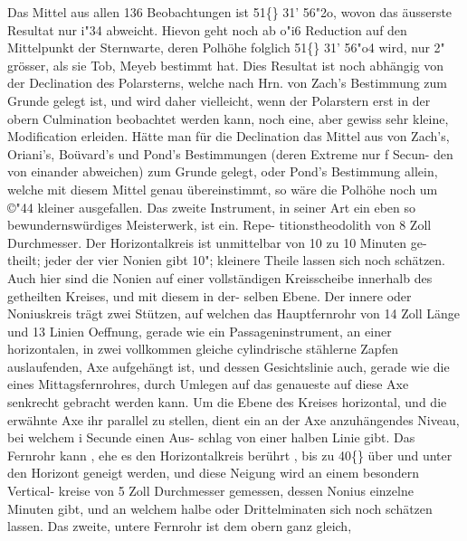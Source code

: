 \documentclass[12pt,a4paper]{article}
\newcommand{\degree}{\textdegree}
\begin{document}
\newpage
Das  Mittel  aus  allen  136  Beobachtungen  ist  51\degree\{\}  31'  56"2o,  wovon  das  äusserste  Resultat  nur  i"34 
abweicht.  Hievon  geht  noch  ab  o"i6  Reduction  auf  den  Mittelpunkt  der  Sternwarte,  deren  Polhöhe 
folglich  51\degree\{\}  31'  56"o4  wird,  nur  2"  grösser,  als  sie  Tob,  Meyeb  bestimmt  hat.  Dies  Resultat  ist  noch 
abhängig  von  der  Declination  des  Polarsterns,  welche  nach  Hrn.  von  Zach's  Bestimmung  zum  Grunde 
gelegt  ist,  und  wird  daher  vielleicht,  wenn  der  Polarstern  erst  in  der  obern  Culmination  beobachtet 
werden  kann,  noch  eine,  aber  gewiss  sehr  kleine,  Modification  erleiden.  Hätte  man  für  die  Declination 
das  Mittel  aus  von  Zach's,  Oriani's,  Boüvard's  und  Pond's  Bestimmungen  (deren  Extreme  nur  f  Secun- 
den  von  einander  abweichen)  zum  Grunde  gelegt,  oder  Pond's  Bestimmung  allein,  welche  mit  diesem 
Mittel  genau  übereinstimmt,  so  wäre  die  Polhöhe  noch  um  ©"44  kleiner  ausgefallen. 
Das  zweite  Instrument,  in  seiner  Art  ein  eben  so  bewundernswürdiges  Meisterwerk,  ist  ein.  Repe- 
titionstheodolith  von  8  Zoll  Durchmesser.  Der  Horizontalkreis  ist  unmittelbar  von  10  zu  10  Minuten  ge- 
theilt;  jeder  der  vier  Nonien  gibt  10";  kleinere  Theile  lassen  sich  noch  schätzen.  Auch  hier  sind  die 
Nonien  auf  einer  vollständigen  Kreisscheibe  innerhalb  des  getheilten  Kreises,  und  mit  diesem  in  der- 
selben Ebene.  Der  innere  oder  Noniuskreis  trägt  zwei  Stützen,  auf  welchen  das  Hauptfernrohr  von 
14  Zoll  Länge  und  13  Linien  Oeffnung,  gerade  wie  ein  Passageninstrument,  an  einer  horizontalen,  in 
zwei  vollkommen  gleiche  cylindrische  stählerne  Zapfen  auslaufenden,  Axe  aufgehängt  ist,  und  dessen 
Gesichtslinie  auch,  gerade  wie  die  eines  Mittagsfernrohres,  durch  Umlegen  auf  das  genaueste  auf  diese 
Axe  senkrecht  gebracht  werden  kann.  Um  die  Ebene  des  Kreises  horizontal,  und  die  erwähnte  Axe  ihr 
parallel  zu  stellen,  dient  ein  an  der  Axe  anzuhängendes  Niveau,  bei  welchem  i  Secunde  einen  Aus- 
schlag von  einer  halben  Linie  gibt.  Das  Fernrohr  kann ,  ehe  es  den  Horizontalkreis  berührt ,  bis  zu  40\degree\{\} 
über  und  unter  den  Horizont  geneigt  werden,  und  diese  Neigung  wird  an  einem  besondern  Vertical- 
kreise  von  5  Zoll  Durchmesser  gemessen,  dessen  Nonius  einzelne  Minuten  gibt,  und  an  welchem  halbe 
oder  Drittelminaten  sich  noch  schätzen  lassen.  Das  zweite,  untere  Fernrohr  ist  dem  obern  ganz  gleich, 
\end{document}

